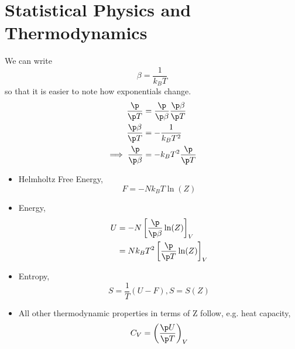\documentclass[a4paper, 11pt, normalem]{report}
\begin{document}
\section{Statistical Physics and Thermodynamics}
We can write
\begin{equation}
    \beta = \frac{1}{k_BT}
\end{equation}
so that it is easier to note how exponentials change.
\begin{align}
    \frac{\p}{\p T} &= \frac{\p}{\p\beta}\frac{\p\beta}{\p T} \\
    \frac{\p\beta}{\p T} &= -\frac{1}{k_BT^2} \\
    \implies \frac{\p}{\p\beta} &= -k_BT^2\frac{\p}{\p T}
\end{align}

\begin{itemize}
    \item Helmholtz Free Energy,
        \begin{equation}
            F = -Nk_BT\ln(Z)
        \end{equation}
    \item Energy,
        \begin{align}
            U &= -N\left[\frac{\p}{\p\beta}\ln(Z)\right]_V \\
              &= Nk_BT^2\left[\frac{\p}{\p T}\ln(Z)\right]_V
        \end{align}
    \item Entropy,
        \begin{equation}
            S = \frac{1}{T}(U-F), S = S(Z)
        \end{equation}
    \item All other thermodynamic properties in terms of Z follow, e.g. heat capacity,
        \begin{equation}
            C_V = \left(\frac{\p U}{\p T}\right)_V
        \end{equation}
\end{itemize}
\end{document}
